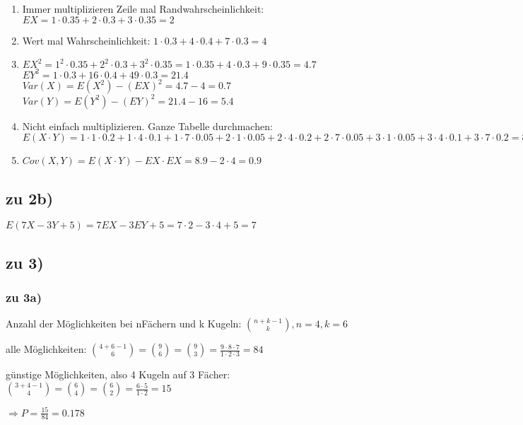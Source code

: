 \begin{enumerate}
\item Immer multiplizieren Zeile mal Randwahrscheinlichkeit: $ EX = 1\cdot 0.35 + 2\cdot 0.3 + 3\cdot 0.35 = 2$
\item Wert mal Wahrscheinlichkeit: $ 1\cdot 0.3 + 4\cdot 0.4 + 7\cdot 0.3 = 4$
\item $EX^2 = 1^2 \cdot 0.35 + 2^2\cdot 0.3 + 3^2\cdot 0.35 = 1\cdot 0.35 + 4\cdot 0.3 + 9\cdot 0.35 = 4.7$\\
$EY^2 = 1\cdot 0.3 + 16\cdot 0.4 + 49\cdot 0.3 = 21.4 $\\
$Var(X) = E(X^2) - (EX)^2 = 4.7 - 4 = 0.7$\\
$Var(Y) = E(Y^2) - (EY)^2 = 21.4 - 16 = 5.4$\\
\item Nicht einfach multiplizieren. Ganze Tabelle durchmachen: $ E(X\cdot Y) = 
1\cdot 1\cdot 0.2 + 
1\cdot 4\cdot 0.1 + 
1\cdot 7\cdot 0.05 + 
2\cdot 1\cdot 0.05 + 
2\cdot 4\cdot 0.2 + 
2\cdot 7\cdot 0.05 + 
3\cdot 1\cdot 0.05 + 
3\cdot 4\cdot 0.1 + 
3\cdot 7\cdot 0.2 = 8.9
$
\item $ Cov(X,Y) = E(X\cdot Y) - EX\cdot EX = 8.9 - 2 \cdot 4 = 0.9$
\end{enumerate}

\subsection{zu 2b)}
$ E(7X - 3Y + 5) = 7 EX - 3 EY + 5 = 7\cdot 2 - 3\cdot 4 + 5 = 7$

\subsection{zu 3)}

\subsubsection{zu 3a)}
Anzahl der Möglichkeiten bei nFächern und k Kugeln: 
$ \binom{n+k-1}{k}, n=4, k=6 $

alle Möglichkeiten: $ \binom{4+6-1}{6} = \binom 9 6 = \binom 9 3 = \frac{9\cdot 8\cdot 7}{1\cdot 2\cdot 3} = 84$

günstige Möglichkeiten, also 4 Kugeln auf 3 Fächer: $ \binom{3+4-1}{4} = \binom 6 4 = \binom 6 2 = \frac{6\cdot 5}{1\cdot 2} = 15$

$\Rightarrow P = \frac{15}{84} = 0.178 $